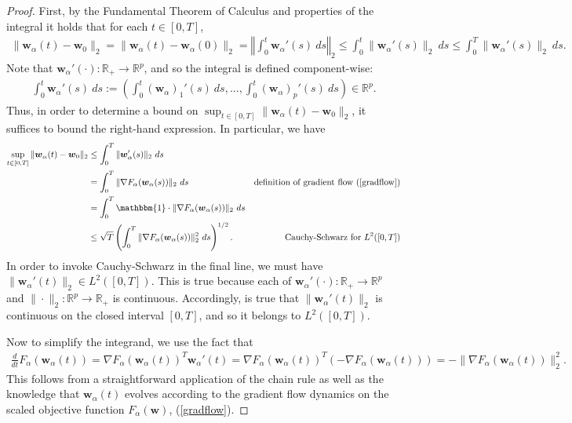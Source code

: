 \documentclass{article}
\begin{document}
\begin{proof}
First, by the Fundamental Theorem of Calculus and properties of the integral it holds that for each $t \in [0, T]$,
\begin{align*}
    \|\boldsymbol{w}_{\alpha}(t) - \boldsymbol{w}_{0} \|_2 = \|\boldsymbol{w}_{\alpha}(t) - \boldsymbol{w}_{\alpha}(0) \|_2 = \left\Vert \int_0^t \boldsymbol{w}_{\alpha}'(s) \ ds  \right\Vert_2 \leq  \int_0^t \| \boldsymbol{w}_{\alpha}'(s) \|_2 \ ds \leq \int_0^T \| \boldsymbol{w}_{\alpha}'(s) \|_2 \ ds.
\end{align*}
Note that $\boldsymbol{w}_{\alpha}'(\cdot): \mathbb{R}_+ \rightarrow \mathbb{R}^p$, and so the integral is defined component-wise:
\begin{align*}
    \int_0^t \boldsymbol{w}_{\alpha}'(s) \ ds := \left( \int_0^t (\boldsymbol{w}_{\alpha})_1'(s) \ ds, \ldots, \int_0^t (\boldsymbol{w}_{\alpha})_p'(s) \ ds  \right) \in \mathbb{R}^p.
\end{align*}
Thus, in order to determine a bound on $\sup_{t \in [0, T]} \|\boldsymbol{w}_{\alpha}(t) - \boldsymbol{w}_0 \|_2$, it suffices to bound the right-hand expression. In particular, we have
\begin{align*}
    \sup_{t \in [0, T]} \|\boldsymbol{w}_{\alpha}(t) - \boldsymbol{w}_0 \|_2 &\leq \int_0^T \| \boldsymbol{w}_{\alpha}'(s) \|_2 \ ds\\
    &=\int_0^T \| \nabla F_{\alpha}(\boldsymbol{w}_{\alpha}(s)) \|_2 \ ds & \text{definition of gradient flow (\ref{gradflow})}\\
    &= \int_0^T \mathbbm{1} \cdot \| \nabla F_{\alpha}(\boldsymbol{w}_{\alpha}(s)) \|_2 \ ds \\
    &\leq \sqrt{T} \left( \int_0^T \| \nabla F_{\alpha}(\boldsymbol{w}_{\alpha}(s)) \|_2^2 \ ds \right)^{1/2}. & \text{Cauchy-Schwarz for $L^2([0, T])$}
\end{align*}
In order to invoke Cauchy-Schwarz in the final line, we must have $ \|\boldsymbol{w}_{\alpha}'(t) \|_2 \in L^2([0, T])$. This is true because each of $\boldsymbol{w}_{\alpha}'(\cdot): \mathbb{R}_+ \rightarrow \mathbb{R}^p$ and $\| \cdot \|_2: \mathbb{R}^p \rightarrow \mathbb{R}_+$ is continuous. Accordingly, is true that $\|\boldsymbol{w}_{\alpha}'(t) \|_2$ is continuous on the closed interval $[0, T]$, and so it belongs to $L^2([0, T])$.

Now to simplify the integrand, we use the fact that 
\begin{align*}
\frac{d}{dt}F_{\alpha}(\boldsymbol{w}_{\alpha}(t)) = \nabla F_{\alpha}(\boldsymbol{w}_{\alpha}(t))^T \boldsymbol{w}_{\alpha}'(t) = \nabla F_{\alpha}(\boldsymbol{w}_{\alpha}(t))^T (- \nabla F_{\alpha}(\boldsymbol{w}_{\alpha}(t))) = - \| \nabla F_{\alpha}(\boldsymbol{w}_{\alpha}(t))\|_2^2.
\end{align*}
This follows from a straightforward application of the chain rule as well as the knowledge that $\boldsymbol{w}_{\alpha}(t)$ evolves according to the gradient flow dynamics on the scaled objective function $F_{\alpha}(\boldsymbol{w})$, (\ref{gradflow}).


\end{proof}
\end{document}
